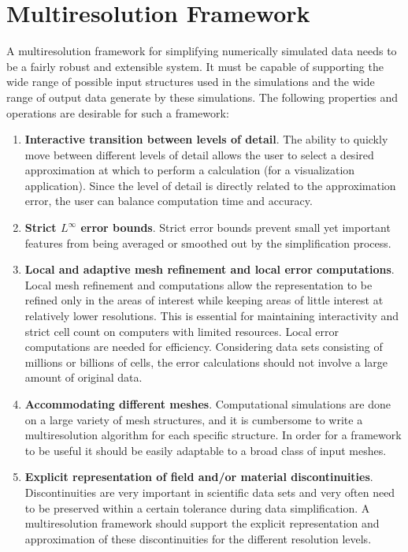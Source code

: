 \documentclass{siggraph}
\begin{document}
\section{Multiresolution Framework}

A multiresolution framework for simplifying numerically simulated data
needs to be a fairly robust and extensible system. It must be capable of
supporting the wide
range of possible input structures used in the simulations and the wide range of output
data generate by these simulations.  The following properties and
operations are desirable for such a framework:


\begin{enumerate}
\item {\bf{Interactive transition between levels of detail}}.  The
ability to quickly move between different levels of detail allows the
user to select a desired approximation at which to perform a
calculation (for a visualization application).  Since the level of
detail is directly related to the approximation error, the user can
balance computation time and accuracy.


\item {\bf{Strict $L^{\infty}$ error bounds}}.  Strict error bounds prevent small yet 
important features from being averaged or smoothed out by the simplification process.


\item {\bf{Local and adaptive mesh refinement and local error
computations}}.  Local mesh refinement and computations allow the
representation to be refined only in the areas of interest while
keeping areas of little interest at relatively lower resolutions.
This is essential for maintaining interactivity and strict cell count
on computers with limited resources.  Local error computations are
needed for efficiency.  Considering data sets consisting of millions
or billions of cells, the error calculations should not involve a
large amount of original data.


\item {\bf{Accommodating different meshes}}.  Computational
simulations are done on a large variety of mesh structures, and it is
cumbersome to write a multiresolution algorithm for each specific
structure.  In order for a framework to be useful it should be easily
adaptable to a broad class of input meshes.


\item {\bf{Explicit representation of field and/or material
discontinuities}}.  Discontinuities are very important in scientific
data sets and very often need to be preserved within a certain
tolerance during data simplification.  A multiresolution framework
should support the explicit representation and approximation of these
discontinuities for the different resolution levels.


\end{enumerate}
\end{document}

